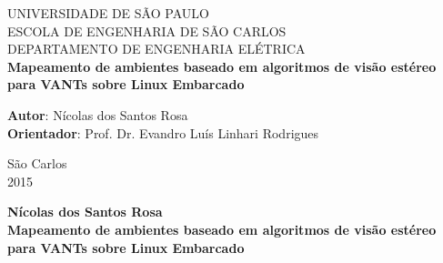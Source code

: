 \begin{titlepage}
	
	\begin{center}
		\Huge{UNIVERSIDADE DE SÃO PAULO}\\
		\vspace{0.02\textheight}
		\huge{ESCOLA DE ENGENHARIA DE SÃO CARLOS}\\
		\vspace{0.01\textheight}
		\huge{DEPARTAMENTO DE ENGENHARIA ELÉTRICA}\\
		\vspace{0.2\textheight}
		\huge{\textbf{Mapeamento de ambientes baseado em algoritmos de visão estéreo para VANTs sobre Linux Embarcado}}
		\vspace{0.2\textheight}
	\end{center}
		
		\large
		{
			\begin{flushleft}
			\Large{ \textbf{Autor}: \hspace{1cm} Nícolas dos Santos Rosa}\\
			\Large{ \textbf{Orientador}: \hspace{0.3cm} Prof. Dr. Evandro Luís Linhari Rodrigues }\\
			\end{flushleft}
	
			\begin{center}
				\vspace{0.09\textheight}
				\Large{São Carlos}\\
				\Large{2015}
			\end{center}
		}
	
\end{titlepage}


\cleardoublepage

	\begin{center}
	\vspace{-0.06\textheight}
		\Large{\textbf{Nícolas dos Santos Rosa}}\\
		\vspace{0.15\textheight}
		\Huge{\textbf{Mapeamento de ambientes baseado em algoritmos de visão estéreo para VANTs sobre Linux Embarcado}} 
		\vspace{0.08\textheight}
	\end{center}
		
